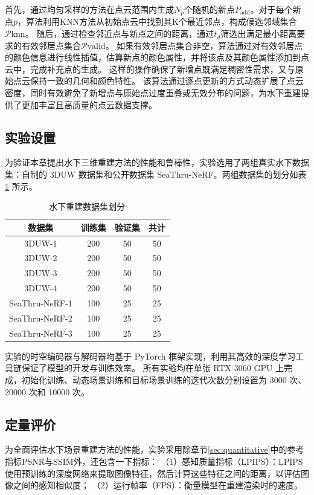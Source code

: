 首先，通过均匀采样的方法在点云范围内生成$N_p$个随机的新点$P_\text{add}$。对于每个新点$p$，算法利用KNN方法从初始点云中找到其K个最近邻点，构成候选邻域集合$\mathcal{P}\text{knn}$。
随后，通过检查邻近点与新点之间的距离，通过$t_d$筛选出满足最小距离要求的有效邻居点集合$\mathcal{P}\text{valid}$。
如果有效邻居点集合非空，算法通过对有效邻居点的颜色信息进行线性插值，估算新点的颜色属性，并将该点及其颜色属性添加到点云中，完成补充点的生成。
这样的操作确保了新增点既满足稠密性需求，又与原始点云保持一致的几何和颜色特性。
该算法通过逐点更新的方式动态扩展了点云密度，同时有效避免了新增点与原始点过度重叠或无效分布的问题，为水下重建提供了更加丰富且高质量的点云数据支撑。

\subsection{实验设置}
为验证本章提出水下三维重建方法的性能和鲁棒性，实验选用了两组真实水下数据集：自制的 3DUW 数据集和公开数据集 SeaThru-NeRF\cite{seathru}。两组数据集的划分如表 \ref{tab:recondata_split} 所示。
\begin{table}[htbp]
    \centering
    \caption{水下重建数据集划分}
    \label{tab:recondata_split}
    \begin{tabular}{cccc}
        \toprule
        数据集 & 训练集 & 验证集 & 共计 \\
        \midrule
        3DUW-1 & 200 & 50 & 50 \\
        3DUW-2 & 200 & 50 & 50 \\
        3DUW-3 & 200 & 50 & 50 \\
        3DUW-4 & 200 & 50 & 50 \\
        SeaThru-NeRF-1 & 100 & 25 & 25 \\
        SeaThru-NeRF-2 & 100 & 25 & 25 \\
        SeaThru-NeRF-3 & 100 & 25 & 25 \\
        \bottomrule
    \end{tabular}
\end{table}
实验的时空编码器与解码器均基于 PyTorch 框架\cite{pytorch}实现，利用其高效的深度学习工具链保证了模型的开发与训练效率。
所有实验均在单张 RTX 3060 GPU 上完成，初始化训练、动态场景训练和目标场景训练的迭代次数分别设置为 3000 次、20000 次和 10000 次。

\subsection{定量评价}
为全面评估水下场景重建方法的性能，实验采用除章节\ref{sec:quantitative}中的参考指标PSNR与SSIM外，还包含一下指标：
（1）感知质量指标（LPIPS）\cite{lpips}：LPIPS 使用预训练的深度网络来提取图像特征，然后计算这些特征之间的距离，以评估图像之间的感知相似度；
（2）运行帧率（FPS）：衡量模型在重建渲染时的速度。

